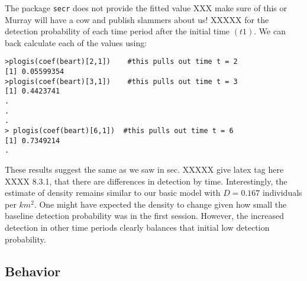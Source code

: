 The package \mbox{\tt secr} does not provide the fitted value XXX make
sure of this or Murray will have a cow and publish slammers about us! XXXXX
for the
detection probability of each time period after the initial time
$(t1)$.
 We can back calculate each of the values using:
{\small
\begin{verbatim}
>plogis(coef(beart)[2,1])    #this pulls out time t = 2
[1] 0.05599354
>plogis(coef(beart)[3,1])    #this pulls out time t = 3
[1] 0.4423741
.
.
.
> plogis(coef(beart)[6,1])  #this pulls out time t = 6
[1] 0.7349214
.
\end{verbatim}
}
These results suggest the same as we saw in sec. XXXXX give latex tag
here  XXXX 8.3.1, that there
are differences in detection by time.  Interestingly, the estimate of
density remains similar to our basic model with $D = 0.167$
individuals per $km ^2$.
One might have expected the density to change given how
small the baseline detection probability was in the first session.
However, the increased detection in other time periods clearly
balances that initial low detection probability.

\subsection{Behavior}


